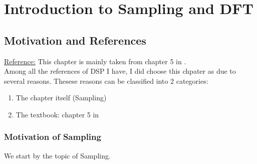 


\chapter{Introduction to Sampling and DFT}
\label{chap:intro_sampling_dft}

\section{Motivation and References}

\underline{Reference:} This chapter is mainly taken from chapter 5 in \cite{signal_processing_Lathi}.\\

Among all the references of DSP I have, I did choose this chpater as  due to several reasons. Thesese reasons can be classified into 2 categories:

\begin{enumerate}

\item The chapter itself (Sampling)

\item The textbook: chapter 5 in \cite{signal_processing_Lathi}

\end{enumerate}

\subsection{Motivation of Sampling}

We start by the topic of Sampling.

